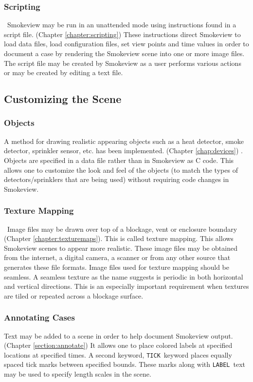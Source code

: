 \documentclass[11pt,twoside]{book}
\begin{document}
\subsubsection{Scripting}\ Smokeview may be run in an unattended mode using
instructions found in a script file. (Chapter
\ref{chapter:scripting}) These instructions direct Smokeview to
load data files, load configuration files, set view points and
time values in order to document a case by rendering the Smokeview
scene into one or more image files. The script file may be created
by Smokeview as a user performs various actions or may be created
by editing a text file.

\subsection{Customizing the Scene}

\subsubsection{Objects}A method for drawing realistic appearing objects such as a heat detector,
smoke detector, sprinkler sensor, etc. has been implemented.
(Chapter \ref{chap:devices}) . Objects are specified in a data
file rather than in Smokeview as C code. This allows one to
customize the look and feel of the objects (to match the types of
detectors/sprinklers that are being used) without requiring code
changes in Smokeview.

\subsubsection{Texture Mapping}\ Image files may be drawn over top
of a blockage, vent or enclosure boundary (Chapter
\ref{chapter:texturemaps}). This is called texture mapping.  This
allows Smokeview scenes to appear more realistic. These image
files may be obtained from the internet, a digital camera, a
scanner or from any other source that generates these file
formats. Image files used for texture mapping should be seamless.
A seamless texture as the name suggests is periodic in both
horizontal and vertical directions. This is an especially
important requirement when textures are tiled or repeated across a
blockage surface.

\subsubsection{Annotating Cases}Text may be added to a scene in order to help document Smokeview
output. (Chapter \ref{section:annotate}) It allows one to place
colored labels at specified locations at specified times. A second
keyword, {\tt TICK}\ keyword places equally spaced tick marks
between specified bounds. These marks along with {\tt LABEL}\ text
may be used to specify length scales in the scene.
\end{document}
